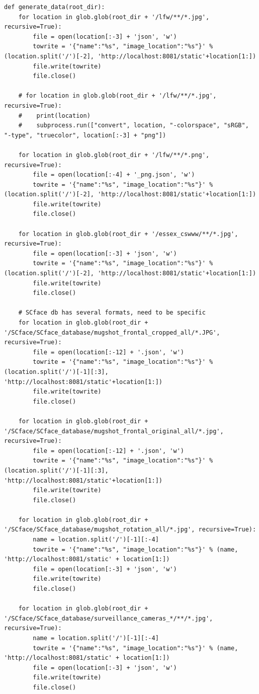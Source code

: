 \documentclass[12pt]{article}
\begin{document}
\begin{appendices}
\begin{lstlisting}
def generate_data(root_dir):
    for location in glob.glob(root_dir + '/lfw/**/*.jpg', recursive=True):
        file = open(location[:-3] + 'json', 'w')
        towrite = '{"name":"%s", "image_location":"%s"}' % (location.split('/')[-2], 'http://localhost:8081/static'+location[1:])
        file.write(towrite)
        file.close()

    # for location in glob.glob(root_dir + '/lfw/**/*.jpg', recursive=True):
    #    print(location)
    #    subprocess.run(["convert", location, "-colorspace", "sRGB", "-type", "truecolor", location[:-3] + "png"])

    for location in glob.glob(root_dir + '/lfw/**/*.png', recursive=True):
        file = open(location[:-4] + '_png.json', 'w')
        towrite = '{"name":"%s", "image_location":"%s"}' % (location.split('/')[-2], 'http://localhost:8081/static'+location[1:])
        file.write(towrite)
        file.close()

    for location in glob.glob(root_dir + '/essex_cswww/**/*.jpg', recursive=True):
        file = open(location[:-3] + 'json', 'w')
        towrite = '{"name":"%s", "image_location":"%s"}' % (location.split('/')[-2], 'http://localhost:8081/static'+location[1:])
        file.write(towrite)
        file.close()

    # SCface db has several formats, need to be specific
    for location in glob.glob(root_dir + '/SCface/SCface_database/mugshot_frontal_cropped_all/*.JPG', recursive=True):
        file = open(location[:-12] + '.json', 'w')
        towrite = '{"name":"%s", "image_location":"%s"}' % (location.split('/')[-1][:3], 'http://localhost:8081/static'+location[1:])
        file.write(towrite)
        file.close()

    for location in glob.glob(root_dir + '/SCface/SCface_database/mugshot_frontal_original_all/*.jpg', recursive=True):
        file = open(location[:-12] + '.json', 'w')
        towrite = '{"name":"%s", "image_location":"%s"}' % (location.split('/')[-1][:3], 'http://localhost:8081/static'+location[1:])
        file.write(towrite)
        file.close()

    for location in glob.glob(root_dir + '/SCface/SCface_database/mugshot_rotation_all/*.jpg', recursive=True):
        name = location.split('/')[-1][:-4]
        towrite = '{"name":"%s", "image_location":"%s"}' % (name, 'http://localhost:8081/static' + location[1:])
        file = open(location[:-3] + 'json', 'w')
        file.write(towrite)
        file.close()

    for location in glob.glob(root_dir + '/SCface/SCface_database/surveillance_cameras_*/**/*.jpg', recursive=True):
        name = location.split('/')[-1][:-4]
        towrite = '{"name":"%s", "image_location":"%s"}' % (name, 'http://localhost:8081/static' + location[1:])
        file = open(location[:-3] + 'json', 'w')
        file.write(towrite)
        file.close()



\end{lstlisting}
\end{appendices}
\end{document}
